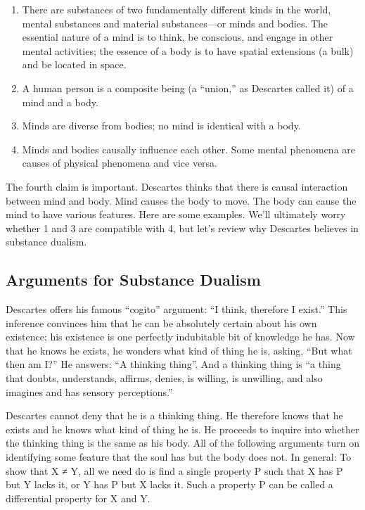 \documentclass[]{article}
\begin{document}
\begin{enumerate}
\def\labelenumi{\arabic{enumi}.}
\itemsep1pt\parskip0pt
\item
  There are substances of two fundamentally different kinds in the
  world, mental substances and material substances---or minds and
  bodies. The essential nature of a mind is to think, be conscious, and
  engage in other mental activities; the essence of a body is to have
  spatial extensions (a bulk) and be located in space.
\item
  A human person is a composite being (a ``union,'' as Descartes called
  it) of a mind and a body.
\item
  Minds are diverse from bodies; no mind is identical with a body.
\item
  Minds and bodies causally influence each other. Some mental phenomena
  are causes of physical phenomena and vice versa.
\end{enumerate}

The fourth claim is important. Descartes thinks that there is causal
interaction between mind and body. Mind causes the body to move. The
body can cause the mind to have various features. Here are some
examples. We'll ultimately worry whether 1 and 3 are compatible with 4,
but let's review why Descartes believes in substance dualism.

\subsection{Arguments for Substance
Dualism}\label{arguments-for-substance-dualism}

Descartes offers his famous ``cogito'' argument: ``I think, therefore I
exist.'' This inference convinces him that he can be absolutely certain
about his own existence; his existence is one perfectly indubitable bit
of knowledge he has. Now that he knows he exists, he wonders what kind
of thing he is, asking, ``But what then am I?'' He answers: ``A thinking
thing''. And a thinking thing is ``a thing that doubts, understands,
affirms, denies, is willing, is unwilling, and also imagines and has
sensory perceptions.''

Descartes cannot deny that he is a thinking thing. He therefore knows
that he exists and he knows what kind of thing he is. He proceeds to
inquire into whether the thinking thing is the same as his body. All of
the following arguments turn on identifying some feature that the soul
has but the body does not. In general: To show that X ≠ Y, all we need
do is find a single property P such that X has P but Y lacks it, or Y
has P but X lacks it. Such a property P can be called a differential
property for X and Y.
\end{document}
